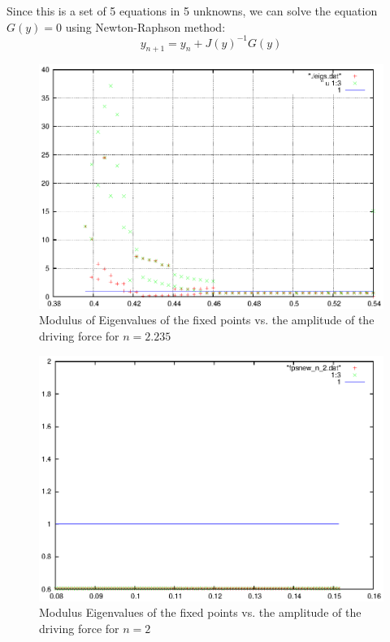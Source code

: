 \documentclass{book}
\renewcommand{\(}{\begin{columns}}
\renewcommand{\)}{\end{columns}}
\newcommand{\<}[1]{\begin{column}{#1}}
\renewcommand{\>}{\end{column}}
\begin{document}
Since this is a set of 5 equations in 5 unknowns, we can solve the equation $G(y)=0$ using Newton-Raphson method:
\[
y_{n+1}=y_n+J(y)^{-1}G(y)
\]


\begin{figure}[!htp]
\caption{Modulus of  Eigenvalues of the fixed points vs. the amplitude of the driving 
force for $n=2.235$}
\label{fig-eig-F-crude}
\begin{center}
\includegraphics[width=0.9\columnwidth]{eigvals}
\end{center}
\end{figure}

\begin{figure}[!htp]
\caption{Modulus Eigenvalues of the fixed points vs. the amplitude of the driving 
force for $n=2$}
\label{fig-eig-F-n2-crude}
\begin{center}
\includegraphics[width=0.9\columnwidth]{eigvals_n2}
\end{center}
\end{figure}
\end{document}
